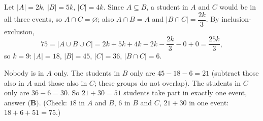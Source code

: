 Let $|A|=2k$, $|B|=5k$, $|C|=4k$. Since $A\subseteq B$, a student in $A$ and $C$ would be in all three events, so $A\cap C=\varnothing$; also $A\cap B=A$ and $|B\cap C|=\dfrac{2k}{3}$. By inclusion-exclusion,
\[
75=|A\cup B\cup C|=2k+5k+4k-2k-\dfrac{2k}{3}-0+0=\dfrac{25k}{3},
\]
so $k=9$: $|A|=18$, $|B|=45$, $|C|=36$, $|B\cap C|=6$.

Nobody is in $A$ only. The students in $B$ only are $45-18-6=21$ (subtract those also in $A$ and those also in $C$; these groups do not overlap). The students in $C$ only are $36-6=30$. So $21+30=\boxed{51}$ students take part in exactly one event, answer $\textbf{(B)}$. (Check: $18$ in $A$ and $B$, $6$ in $B$ and $C$, $21+30$ in one event: $18+6+51=75$.)
